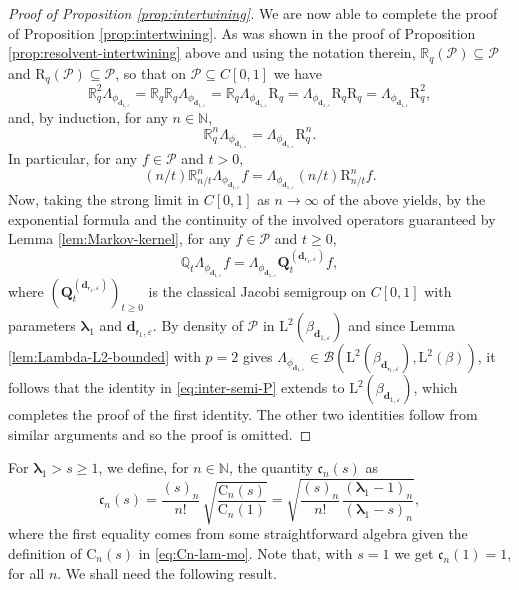 \documentclass[10pt]{amsart}
\let\epsilon\varepsilon
\theoremstyle{plain}
\theoremstyle{definition}
\newcommand{\N}{\mathbb{N}}
\newcommand{\Poly}{\mathscr{P}}
\newcommand{\C}{{\mathrm{C}}}
\newcommand{\J}{\mathds{Q}}
\newcommand{\Leb}{\mathrm{L}}
\newcommand{\dpt}{\bm{d}_{\vat,\epsilon}}
\newcommand{\dz}{{\bm{d}}_{1,\epsilon}}
\newcommand{\Bop}[2]{\mathcal{B}(#1,#2)}
\newcommand{\lam}{{\bm{\lambda}_1}}
\newcommand{\vat}{{\mathsf{r}_1}}
\newcommand{\Q}[1][\mo]{\mathbf{Q}^{({#1})}}
\newcommand{\gab}[1][\lam,\mo]{{\beta_{#1}}}
\let\mo\mu
\let\bpsi\beta
\begin{document}
\begin{proof}[Proof of Proposition \ref{prop:intertwining}]
We are now able to complete the proof of Proposition \ref{prop:intertwining}. As was shown in the proof of
Proposition \ref{prop:resolvent-intertwining} above and using the notation therein, $\mathds{R}_q(\Poly) \subseteq \Poly$ and $\mathrm{R}_q(\Poly) \subseteq \Poly$, so that on $\Poly \subseteq C[0,1]$ we have
\begin{equation*}
\mathds{R}_q^2 \Lambda_{\phi_{\dz}} = \mathds{R}_q\mathds{R}_q \Lambda_{\phi_{\dz}} = \mathds{R}_q \Lambda_{\phi_{\dz}} \mathrm{R}_q = \Lambda_{\phi_{\dz}} \mathrm{R}_q \mathrm{R}_q = \Lambda_{\phi_{\dz}} \mathrm{R}_q^2,
\end{equation*}
and, by induction, for any $n \in \N$,
\begin{equation*}
\mathds{R}_q^n \Lambda_{\phi_{\dz}} = \Lambda_{\phi_{\dz}} \mathrm{R}_q^n.
\end{equation*}
In particular, for any $f \in \Poly$ and $t > 0$,
\begin{equation*}
(n/t)\mathds{R}_{n/t}^n \Lambda_{\phi_{\dz}} f = \Lambda_{\phi_{\dz}} (n/t)\mathrm{R}_{n/t}^n f.
\end{equation*}
Now, taking the strong limit in $C[0,1]$ as $n\to\infty$ of the above yields, by the exponential formula \cite[Th.\,8.3]{pazy:1983} and the continuity of the involved operators guaranteed by Lemma \ref{lem:Markov-kernel}, for any $f \in \Poly$ and $t \geq 0$,
\begin{equation}
\label{eq:inter-semi-P}
\J_t \Lambda_{\phi_{\dz}} f = \Lambda_{\phi_{\dz}} \Q[\dpt]_t f,
\end{equation}
where $(\Q[\dpt]_t)_{t \geq 0}$ is the classical Jacobi semigroup on $C[0,1]$ with parameters $\lam$ and $\dpt$. By density of $\Poly$ in $\Leb^2(\gab[\dz])$ and since Lemma \ref{lem:Lambda-L2-bounded} with $p=2$ gives $\Lambda_{\phi_{\dz}} \in \Bop{\Leb^2(\gab[\dpt])}{\Leb^2(\bpsi)}$, it follows that the identity in \eqref{eq:inter-semi-P} extends to $\Leb^2(\gab[\dz])$, which completes the proof of the first identity. The other two identities follow from similar arguments and so the proof is omitted.
\end{proof}

For $\lam > s \geq 1$, we define, for $n \in \N$, the quantity $\mathfrak{c}_n(s)$ as
\begin{equation}
\label{eq:defn-cn}
\mathfrak{c}_n(s) = \frac{(s)_n}{n!}\, \sqrt{\frac{\C_n(s)}{\C_n(1)}} = \sqrt{\frac{(s)_n}{n!}\,\frac{(\lam-1)_n}{(\lam-s)_n}},
\end{equation}
where the first equality comes from some straightforward algebra given the definition of $\C_n(s)$ in \eqref{eq:Cn-lam-mo}. Note that, with $s=1$ we get $\mathfrak{c}_n(1) = 1$, for all $n$. We shall need the following result.
\end{document}
